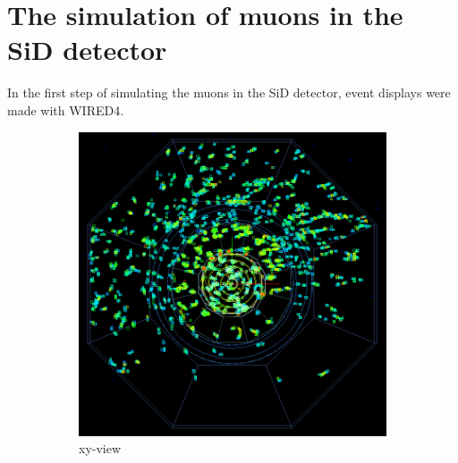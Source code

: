 \section{The simulation of muons in the SiD detector}
\label{Detector}

In the first step of simulating the muons in the SiD detector, event displays were made with WIRED4.

\begin{figure}
    \centering
    \begin{subfigure}[b]{0.49\textwidth}
    \centering
        \includegraphics[height=0.3\textheight]{figures/muons_positron_5spoilers_wall_515_xyview_croped.png}
        \caption{xy-view}
	\label{fig:xy_5Spoilers}
    \end{subfigure}
    \begin{subfigure}[b]{0.49\textwidth}
    \centering

\end{subfigure}
\end{figure}
